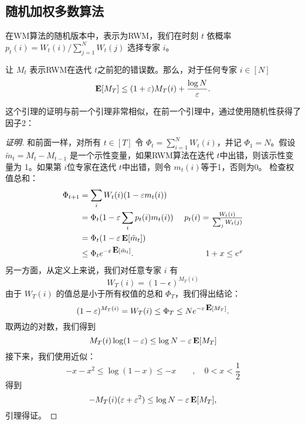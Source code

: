\subsection{
	随机加权多数算法
	}
在WM算法的随机版本中，表示为RWM，我们在时刻 $t$ 依概率 $p_t(i) = W_t(i) /  \sum_{j=1}^N W_t(j)$ 选择专家 $i$。
\begin{lemma} \label{lem:rwm}
让 $M_t$ 表示RWM在迭代 $t$之前犯的错误数。那么，对于任何专家 $i \in [N]$
\[
\mathop{\mbox{\bf E}}[ M_T]  \le (1+\varepsilon)M_T(i) + \frac{\log N}{\varepsilon} .
\]
\end{lemma}
\noindent 这个引理的证明与前一个引理非常相似，在前一个引理中，通过使用随机性获得了 因子2：

\begin{proof}[证明]
和前面一样，对所有 $t \in [T]$ 令 $\Phi_t= \sum_{i=1}^N W_t(i)$，并记 $\Phi_1=N$。假设 $\tilde{m}_t = M_t - M_{t-1}$ 是一个示性变量，如果RWM算法在迭代 $t$中出错，则该示性变量为 1。如果第 $i$位专家在迭代 $t$中出错，则令 $m_t(i)$等于1，否则为0。
检查权值总和：
\begin{align*}
\Phi_{t+1} & = \sum_i W_t(i) (1 - \varepsilon m_t(i)) \\
& = \Phi_t (1 - \varepsilon  \sum_i p_t(i) m_t(i)) & \mbox{ $p_t(i) = \frac{W_t(i)}{\sum_j W_t(j) }$} \\
& = \Phi_t ( 1 - \varepsilon \mathop{\mbox{\bf E}}[\tilde{m}_t ]) \\
& \leq \Phi_t e^{-\varepsilon \mathop{\mbox{\bf E}}[\tilde{m}_t] }. & \mbox{ $1  + x \leq e^x $}  
\end{align*}
另一方面，从定义上来说，我们对任意专家 $i$ 有
\[
W_T(i) = (1-\epsilon)^{M_T(i)} 
\]
由于 $W_T(i)$  的值总是小于所有权值的总和 $\Phi_T$，我们得出结论：
\[
(1-\varepsilon)^{M_T(i)} = W_T(i) \le \Phi_T \le N e^{-\varepsilon \mathop{\mbox{\bf E}} [M_T]}.
\]
取两边的对数，我们得到
\[
M_T(i)\log(1-\varepsilon) \le \log{N} - \varepsilon \mathop{\mbox{\bf E}}[ M_T] 
\]
接下来，我们使用近似：
\[
-x-x^2 \le \log{(1-x)} \le -x \qquad , \quad 0 < x <  \frac{1}{2}
\]
得到
\[
-M_T(i)(\varepsilon+\varepsilon^2) \le \log{N} - \varepsilon \mathop{\mbox{\bf E}}[M_T] ,
\]
引理得证。
\end{proof}




